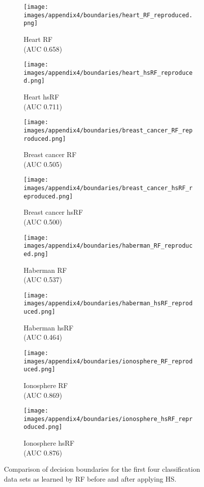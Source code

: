 \begin{figure}[hbt]
    \centering
    \begin{subfigure}[b]{0.45\textwidth}
        \centering
        \texttt{[image: images/appendix4/boundaries/heart\_RF\_reproduced.png]}
        \caption{Heart RF \\ (AUC 0.658)}
    \end{subfigure}
    \begin{subfigure}[b]{0.45\textwidth}
        \centering
        \texttt{[image: images/appendix4/boundaries/heart\_hsRF\_reproduced.png]}
        \caption{Heart hsRF \\ (AUC 0.711)}
    \end{subfigure}
    
    \begin{subfigure}[b]{0.45\textwidth}
        \centering
        \texttt{[image: images/appendix4/boundaries/breast\_cancer\_RF\_reproduced.png]}
        \caption{Breast cancer RF \\ (AUC 0.505)}
    \end{subfigure}
    \begin{subfigure}[b]{0.45\textwidth}
        \centering
        \texttt{[image: images/appendix4/boundaries/breast\_cancer\_hsRF\_reproduced.png]}
        \caption{Breast cancer hsRF \\ (AUC 0.500)}
    \end{subfigure}
    
    \begin{subfigure}[b]{0.45\textwidth}
        \centering
        \texttt{[image: images/appendix4/boundaries/haberman\_RF\_reproduced.png]}
        \caption{Haberman RF \\ (AUC 0.537)}
    \end{subfigure}
    \begin{subfigure}[b]{0.45\textwidth}
        \centering
        \texttt{[image: images/appendix4/boundaries/haberman\_hsRF\_reproduced.png]}
        \caption{Haberman hsRF \\ (AUC 0.464)}
    \end{subfigure}
    
    \begin{subfigure}[b]{0.45\textwidth}
        \centering
        \texttt{[image: images/appendix4/boundaries/ionosphere\_RF\_reproduced.png]}
        \caption{Ionosphere RF \\ (AUC 0.869)}
    \end{subfigure}
    \begin{subfigure}[b]{0.45\textwidth}
        \centering
        \texttt{[image: images/appendix4/boundaries/ionosphere\_hsRF\_reproduced.png]}
        \caption{Ionosphere hsRF \\ (AUC 0.876)}
    \end{subfigure}
    \caption{Comparison of decision boundaries for the first four classification data sets as learned by RF before and after applying HS.}
    \label{fig:apx4-boundary1}
\end{figure}

